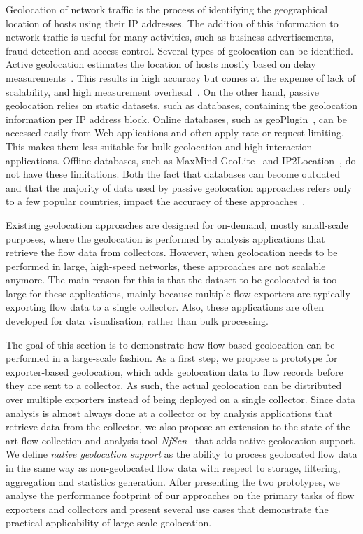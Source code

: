 Geolocation of network traffic is the process of identifying the geographical location of hosts using their IP addresses. The addition of this information to network traffic is useful for many activities, such as business advertisements, fraud detection and access control. Several types of geolocation can be identified. Active geolocation estimates the location of hosts mostly based on delay measurements~\cite{Katz-Bassett-2006-Towards, Eriksson-2010-Learning}. This results in high accuracy but comes at the expense of lack of scalability, and high measurement overhead~\cite{Poese-2011-IP}. On the other hand, passive geolocation relies on static datasets, such as databases, containing the geolocation information per IP address block. Online databases, such as geoPlugin~\cite{--geoPlugin}, can be accessed easily from Web applications and often apply rate or request limiting. This makes them less suitable for bulk geolocation and high-interaction applications. Offline databases, such as MaxMind GeoLite~\cite{MaxMind--GeoLite} and IP2Location~\cite{IP2Location--IP}, do not have these limitations. Both the fact that databases can become outdated and that the majority of data used by passive geolocation approaches refers only to a few popular countries, impact the accuracy of these approaches~\cite{Poese-2011-IP}.
 
Existing geolocation approaches are designed for on-demand, mostly small-scale purposes, where the geolocation is performed by analysis applications that retrieve the flow data from collectors. However, when geolocation needs to be performed in large, high-speed networks, these approaches are not scalable anymore. The main reason for this is that the dataset to be geolocated is too large for these applications, mainly because multiple flow exporters are typically exporting flow data to a single collector. Also, these applications are often developed for data visualisation, rather than bulk processing.

The goal of this section is to demonstrate how flow-based geolocation can be performed in a large-scale fashion. As a first step, we propose a prototype for exporter-based geolocation, which adds geolocation data to flow records before they are sent to a collector. As such, the actual geolocation can be distributed over multiple exporters instead of being deployed on a single collector. Since data analysis is almost always done at a collector or by analysis applications that retrieve data from the collector, we also propose an extension to the state-of-the-art flow collection and analysis tool \textit{NfSen}~\cite{Haag-2011-NfSen} that adds native geolocation support. We define \textit{native geolocation support} as the ability to process geolocated flow data in the same way as non-geolocated flow data with respect to storage, filtering, aggregation and statistics generation. After presenting the two prototypes, we analyse the performance footprint of our approaches on the primary tasks of flow exporters and collectors and present several use cases that demonstrate the practical applicability of large-scale geolocation.

